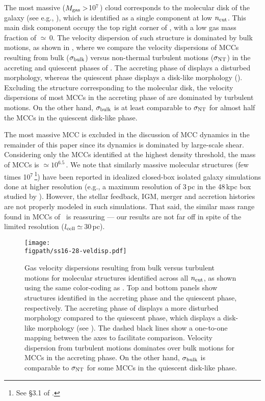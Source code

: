 \IfFileExists{emulateapjlegacy.cls}{\documentclass[iop]{emulateapjlegacy}}{\documentclass[iop]{emulateapj}}
\def\figpath{./Fig}
\begin{document}
The most massive ($M_{\rm gas}>$10$^7$\,\Msun) cloud corresponds to the molecular disk of the galaxy (see e.g., ), 
which is identified as a single component at low $n_{\rm cut}$. This main disk component occupy the top right corner of , with a 
low gas mass fraction of $\simeq$\,0.
The velocity dispersion of such structure is dominated by bulk motions, as shown in , where we compare 
the velocity dispersions of MCCs resulting from bulk ($\sigma_{\rm bulk}$) versus non-thermal turbulent motions ($\sigma_{\rm NT}$) 
in the accreting and quiescent phases of \flower.
The accreting phase of \flower displays a disturbed morphology, whereas the 
quiescent phase displays a disk-like morphology ().
Excluding the structure corresponding to the molecular disk, the 
velocity dispersions of most MCCs in the accreting phase of \flower are dominated by turbulent motions.
On the other hand, $\sigma_{\rm bulk}$ is at least comparable to $\sigma_{\rm NT}$ for almost half the MCCs
in the quiescent disk-like phase.

The most massive MCC is excluded in the discussion of MCC dynamics in the remainder of this paper
since its dynamics is dominated by large-scale shear.
Considering only the MCCs identified at the highest density threshold, the mass of MCCs is $\simeq10^{6.5}$\,\Msun.
We note that similarly massive molecular structures (few times 10$^7$\,\Msun\footnote{See \S{3.1} of \citet{Behrendt16a}.}) 
have been reported in idealized closed-box isolated galaxy simulations done at higher resolution (e.g., a maximum resolution of 3\,pc in the 48\,kpc box studied by \citealt{Behrendt16a}). However, the stellar feedback, IGM, merger and accretion histories are not properly modeled in such simulations. That said, the similar mass range found in MCCs of \flower\ is reassuring --- our results are not far off in spite of the limited resolution ($l_{\rm cell}\simeq$\,30\,pc).

\begin{figure}
\centering
\texttt{[image: \\figpath/ss16-28-veldisp.pdf]}
\caption{Gas velocity dispersions resulting from bulk versus turbulent motions for molecular structures 
identified across all $n_{\rm cut}$, as shown using the same color-coding as .
%
Top and bottom panels show structures identified in the accreting phase and the quiescent phase, respectively.
The accreting phase of \flower displays a more disturbed morphology compared to the quiescent phase, which displays a disk-like morphology (see ).
%
The dashed black lines show a one-to-one mapping between the axes to facilitate comparison. 
%
Velocity dispersion from turbulent motions dominates over bulk motions for MCCs in the accreting phase. On the other hand, 
$\sigma_{\rm bulk}$ is comparable to $\sigma_{\rm NT}$ for some MCCs in the quiescent disk-like phase.
\label{fig:vv}}
\vspace{0.5em}
\end{figure}
\end{document}
